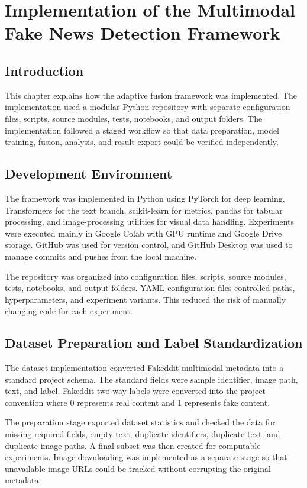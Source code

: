 \chapter{Implementation of the Multimodal Fake News Detection Framework}


\section{Introduction}


This chapter explains how the adaptive fusion framework was implemented. The implementation used a modular Python repository with separate configuration files, scripts, source modules, tests, notebooks, and output folders. The implementation followed a staged workflow so that data preparation, model training, fusion, analysis, and result export could be verified independently.


\section{Development Environment}


The framework was implemented in Python using PyTorch for deep learning, Transformers for the text branch, scikit-learn for metrics, pandas for tabular processing, and image-processing utilities for visual data handling. Experiments were executed mainly in Google Colab with GPU runtime and Google Drive storage. GitHub was used for version control, and GitHub Desktop was used to manage commits and pushes from the local machine.


The repository was organized into configuration files, scripts, source modules, tests, notebooks, and output folders. YAML configuration files controlled paths, hyperparameters, and experiment variants. This reduced the risk of manually changing code for each experiment.


\section{Dataset Preparation and Label Standardization}


The dataset implementation converted Fakeddit multimodal metadata into a standard project schema. The standard fields were sample identifier, image path, text, and label. Fakeddit two-way labels were converted into the project convention where 0 represents real content and 1 represents fake content.


The preparation stage exported dataset statistics and checked the data for missing required fields, empty text, duplicate identifiers, duplicate text, and duplicate image paths. A final subset was then created for computable experiments. Image downloading was implemented as a separate stage so that unavailable image URLs could be tracked without corrupting the original metadata.


